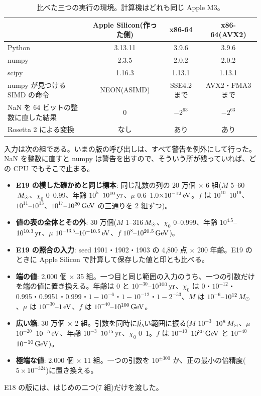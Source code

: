 \begin{table}[H]
\centering\small
\begin{tabular}{lccc}
\toprule
 & Apple Silicon(作った側) & x86-64 & x86-64(AVX2)\\
\midrule
Python & 3.13.11 & 3.9.6 & 3.9.6\\
numpy & 2.3.5 & 2.0.2 & 2.0.2\\
scipy & 1.16.3 & 1.13.1 & 1.13.1\\
numpy が見つける SIMD の命令 & NEON(ASIMD) & SSE4.2 まで & AVX2・FMA3 まで\\
NaN を 64 ビットの整数に直した結果 & 0 & $-2^{63}$ & $-2^{63}$\\
Rosetta 2 による変換 & なし & あり & あり\\
\bottomrule
\end{tabular}
\caption{比べた三つの実行の環境。計算機はどれも同じ Apple M3。}
\label{tab:e20env}
\end{table}

入力は次の組である。いまの版の呼び出しは、すべて警告を例外にして行った。NaN を整数に直すと numpy は警告を出すので、そういう所が残っていれば、どの CPU でもそこで止まる。
\begin{itemize}
\item \textbf{E19 の模した確かめと同じ標本}: 同じ乱数の列の 20 万個 × 6 組($M$ 5--60$\,M_\odot$、$\chi_0$ 0--0.99、年齢 $10^5$--$10^{10}\,\mathrm{yr}$、$\mu$ 0.6--1.0$\times10^{-12}\,\mathrm{eV}$。$f$ は $10^{10}$--$10^{19}$、$10^{11}$--$10^{13}$、$10^{17}$--$10^{20}\,\mathrm{GeV}$ の三通りを 2 組ずつ)。
\item \textbf{値の表の全体とその外}: 30 万個($M$ 1--316$\,M_\odot$、$\chi_0$ 0--0.999、年齢 $10^{4.5}$--$10^{10.3}\,\mathrm{yr}$、$\mu$ $10^{-13.5}$--$10^{-10.5}\,\mathrm{eV}$、$f$ $10^{8}$--$10^{20.5}\,\mathrm{GeV}$)。
\item \textbf{E19 の照合の入力}: seed 1901・1902・1903 の 4{,}800 点 × 200 年齢。E19 のときに Apple Silicon で計算して保存した値と印とも比べる。
\item \textbf{端の値}: 2{,}000 個 × 35 組。一つ目と同じ範囲の入力のうち、一つの引数だけを端の値に置き換える。年齢は 0 と $10^{-30}$--$10^{100}\,\mathrm{yr}$、$\chi_0$ は 0・$10^{-12}$・0.995・0.9951・0.999・$1-10^{-6}$・$1-10^{-12}$・$1-2^{-53}$、$M$ は $10^{-6}$--$10^{12}\,M_\odot$、$\mu$ は $10^{-30}$--$1\,\mathrm{eV}$、$f$ は $10^{-40}$--$10^{100}\,\mathrm{GeV}$。
\item \textbf{広い箱}: 30 万個 × 2 組。引数を同時に広い範囲に振る($M$ $10^{-3}$--$10^{6}\,M_\odot$、$\mu$ $10^{-20}$--$10^{-5}\,\mathrm{eV}$、年齢 $10^{-3}$--$10^{15}\,\mathrm{yr}$、$\chi_0$ 0--1。$f$ は $10^{-10}$--$10^{30}\,\mathrm{GeV}$ と $10^{-40}$--$10^{-10}\,\mathrm{GeV}$)。
\item \textbf{極端な値}: 2{,}000 個 × 11 組。一つの引数を $10^{\pm300}$ か、正の最小の倍精度($5\times10^{-324}$)に置き換える。
\end{itemize}
E18 の版には、はじめの二つ(7 組)だけを渡した。

